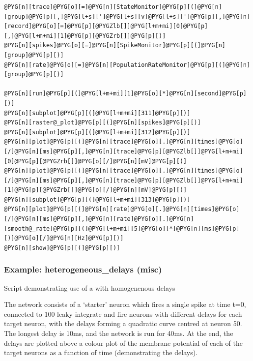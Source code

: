 \documentclass[letterpaper,10pt,english]{manual}
\begin{document}
\begin{Verbatim}[commandchars=@\[\]]
@PYG[n][trace]@PYG[o][=]@PYG[n][StateMonitor]@PYG[p][(]@PYG[n][group]@PYG[p][,]@PYG[l+s][']@PYG[l+s][v]@PYG[l+s][']@PYG[p][,]@PYG[n][record]@PYG[o][=]@PYG[p][@PYGZlb[]]@PYG[l+m+mi][0]@PYG[p][,]@PYG[l+m+mi][1]@PYG[p][@PYGZrb[]]@PYG[p][)]
@PYG[n][spikes]@PYG[o][=]@PYG[n][SpikeMonitor]@PYG[p][(]@PYG[n][group]@PYG[p][)]
@PYG[n][rate]@PYG[o][=]@PYG[n][PopulationRateMonitor]@PYG[p][(]@PYG[n][group]@PYG[p][)]

@PYG[n][run]@PYG[p][(]@PYG[l+m+mi][1]@PYG[o][*]@PYG[n][second]@PYG[p][)]
@PYG[n][subplot]@PYG[p][(]@PYG[l+m+mi][311]@PYG[p][)]
@PYG[n][raster@_plot]@PYG[p][(]@PYG[n][spikes]@PYG[p][)]
@PYG[n][subplot]@PYG[p][(]@PYG[l+m+mi][312]@PYG[p][)]
@PYG[n][plot]@PYG[p][(]@PYG[n][trace]@PYG[o][.]@PYG[n][times]@PYG[o][/]@PYG[n][ms]@PYG[p][,]@PYG[n][trace]@PYG[p][@PYGZlb[]]@PYG[l+m+mi][0]@PYG[p][@PYGZrb[]]@PYG[o][/]@PYG[n][mV]@PYG[p][)]
@PYG[n][plot]@PYG[p][(]@PYG[n][trace]@PYG[o][.]@PYG[n][times]@PYG[o][/]@PYG[n][ms]@PYG[p][,]@PYG[n][trace]@PYG[p][@PYGZlb[]]@PYG[l+m+mi][1]@PYG[p][@PYGZrb[]]@PYG[o][/]@PYG[n][mV]@PYG[p][)]
@PYG[n][subplot]@PYG[p][(]@PYG[l+m+mi][313]@PYG[p][)]
@PYG[n][plot]@PYG[p][(]@PYG[n][rate]@PYG[o][.]@PYG[n][times]@PYG[o][/]@PYG[n][ms]@PYG[p][,]@PYG[n][rate]@PYG[o][.]@PYG[n][smooth@_rate]@PYG[p][(]@PYG[l+m+mi][5]@PYG[o][*]@PYG[n][ms]@PYG[p][)]@PYG[o][/]@PYG[n][Hz]@PYG[p][)]
@PYG[n][show]@PYG[p][(]@PYG[p][)]
\end{Verbatim}

\resetcurrentobjects
\hypertarget{--doc-examples-misc_heterogeneous_delays}{}

\hypertarget{index-47}{}\subsubsection{Example: heterogeneous\_delays (misc)}

Script demonstrating use of a \hyperlink{brian.Connection}{} with homogenenous delays

The network consists of a `starter' neuron which fires a single spike at time
t=0, connected to 100 leaky integrate and fire neurons with different delays
for each target neuron, with the delays forming a quadratic curve centred at
neuron 50. The longest delay is 10ms, and the network is run for 40ms. At
the end, the delays are plotted above a colour plot of the membrane potential
of each of the target neurons as a function of time (demonstrating the
delays).
\end{document}
